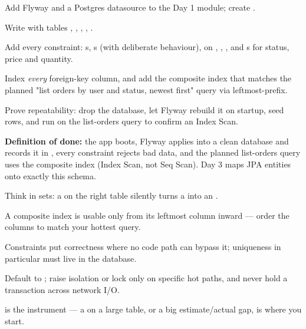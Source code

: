 \begin{buildalong}
\begin{wbitem}
  \item Add Flyway and a Postgres datasource to the Day 1 module; create .
  \item Write  with tables , , , , .
  \item Add every constraint: s, s (with deliberate  behaviour),  on , , , and s for status, price and quantity.
  \item Index \emph{every} foreign-key column, and add the composite index  that matches the planned "list orders by user and status, newest first" query via leftmost-prefix.
  \item Prove repeatability: drop the database, let Flyway rebuild it on startup, seed rows, and run  on the list-orders query to confirm an Index Scan.
\end{wbitem}
\smallskip\textbf{Definition of done:} the app boots, Flyway applies  into a clean database and records it in , every constraint rejects bad data, and the planned list-orders query uses the composite index (Index Scan, not Seq Scan). Day 3 maps JPA entities onto exactly this schema.
\end{buildalong}


\begin{tickcheck}
  \item Think in sets: a  on the right table silently turns a  into an .
  \item A composite index is usable only from its leftmost column inward --- order the columns to match your hottest query.
  \item Constraints put correctness where no code path can bypass it; uniqueness in particular must live in the database.
  \item Default to ; raise isolation or lock only on specific hot paths, and never hold a transaction across network I/O.
  \item {} is the instrument --- a  on a large table, or a big estimate/actual gap, is where you start.
\end{tickcheck}

